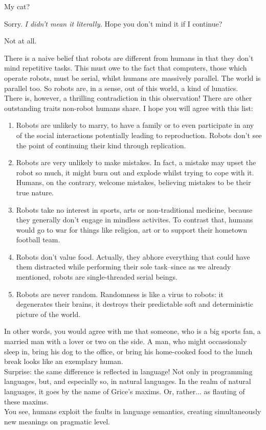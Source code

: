\documentclass[11pt,a4paper,oneside]{memoir}
\begin{document}
\begin{description}[itemsep=1ex,leftmargin=1cm]
\item[Ronen] My cat?

\item[Oleg] Sorry. \textit{I didn't mean it literally.} Hope you don't
  mind it if I continue?

\item[Ronen] Not at all.

\item[Oleg] There is a naive belief that robots are different from humans
  in that they don't mind repetitive tasks. This must owe to the fact
  that computers, those which operate robots, must be serial, whilst
  humans are massively parallel. The world is parallel too. So robots
  are, in a sense, out of this world, a kind of lunatics.\\
  There is, however, a thrilling contradiction in this observation!
  There are other outstanding traits non-robot humans share. I hope
  you will agree with this list:
  \begin{enumerate}
  \item Robots are unlikely to marry, to have a family or to even
    participate in any of the social interactions potentially
    leading to reproduction. Robots don't see the point of continuing
    their kind through replication.
  \item Robots are very unlikely to make mistakes. In fact, a mistake
    may upset the robot so much, it might burn out and explode whilst
    trying to cope with it. Humans, on the contrary, welcome mistakes,
    believing mistakes to be their true nature.
  \item Robots take no interest in sports, arts or non-traditional
    medicine, because they generally don't engage in mindless activites.
    To contrast that, humans would go to war for things like religion,
    art or to support their hometown football team.
  \item Robots don't value food. Actually, they abhore everything that
    could have them distracted while performing their sole task--since
    as we already mentioned, robots are single-threaded serial beings.
  \item Robots are never random. Randomness is like a virus to robots:
    it degenerates their brains, it destroys their predictable soft
    and deterministic picture of the world.
  \end{enumerate}
  In other words, you would agree with me that someone, who is a big
  sports fan, a married man with a lover or two on the side. A man,
  who might occassionaly sleep in, bring his dog to the office, or
  bring his home-cooked food to the lunch break looks like an exemplary
  human.\\
  Surprise: the same difference is reflected in language! Not only
  in programming languages, but, and especially so, in natural
  languages. In the realm of natural languages, it goes by the name
  of Grice's maxims. Or, rather... as flauting of these maxims.\\
  You see, humans exploit the faults in language semantics, creating
  simultaneously new meanings on pragmatic level.

\end{description}
\vskip 1cm
\end{document}

